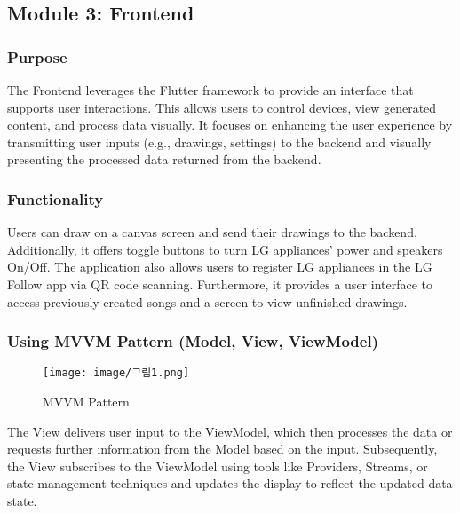 \documentclass[conference]{IEEEtran}
\begin{document}
\subsection{Module 3: Frontend}

\subsubsection{Purpose}
\noindent The Frontend leverages the Flutter framework to provide an interface that supports user interactions. This allows users to control devices, view generated content, and process data visually. It focuses on enhancing the user experience by transmitting user inputs (e.g., drawings, settings) to the backend and visually presenting the processed data returned from the backend.\\

\subsubsection{Functionality}
\noindent Users can draw on a canvas screen and send their drawings to the backend. Additionally, it offers toggle buttons to turn LG appliances' power and speakers On/Off. The application also allows users to register LG appliances in the LG Follow app via QR code scanning. Furthermore, it provides a user interface to access previously created songs and a screen to view unfinished drawings.\\

\subsubsection{Using MVVM Pattern (Model, View, ViewModel)}

\begin{figure}[h!]
    \centering
    \texttt{[image: image/그림1.png]}
    \caption{MVVM Pattern}
    \label{fig:enter-label}
\end{figure}
\noindent The View delivers user input to the ViewModel, which then processes the data or requests further information from the Model based on the input. Subsequently, the View subscribes to the ViewModel using tools like Providers, Streams, or state management techniques and updates the display to reflect the updated data state.\\
\end{document}
